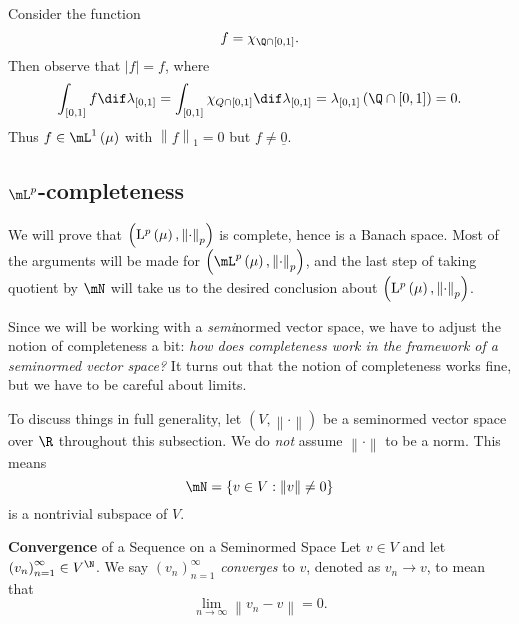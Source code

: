 \documentclass[pmath450]{subfiles}
\begin{document}
    \begin{answer}
        Consider the function
        \begin{equation*}
            f = \chi_{\Q\cap\left[ 0,1 \right]}.
        \end{equation*}
        Then observe that $\left| f \right|=f$, where
        \begin{equation*}
            \int_{\left[ 0,1 \right]} f\dif\lambda_{\left[ 0,1 \right]} = \int_{\left[ 0,1 \right]} \chi_{Q\cap\left[ 0,1 \right]} \dif\lambda_{\left[ 0,1 \right]} = \lambda_{\left[ 0,1 \right]}\left( \Q\cap\left[ 0,1 \right] \right) = 0.
        \end{equation*}
        Thus $f\in\lone\left( \mu \right)$ with $\left\lVert f \right\rVert_{1}=0$ but $f\neq\underline{0}$.
    \end{answer}
    
    \subsection{$\lp$-completeness}

    We will prove that $\left( \operatorname{L^{\text{$p$}}}\left( \mu \right),\left\lVert \cdot\right\rVert_p \right)$ is complete, hence is a Banach space. Most of the arguments will be made for $\left( \lp\left( \mu \right),\left\lVert \cdot\right\rVert_p \right)$, and the last step of taking quotient by $\mN$ will take us to the desired conclusion about $\left( \operatorname{L^{\text{$p$}}}\left( \mu \right),\left\lVert \cdot\right\rVert_p \right)$.
    
    \np Since we will be working with a \textit{semi}normed vector space, we have to adjust the notion of completeness a bit: \textit{how does completeness work in the framework of a seminormed vector space?} It turns out that the notion of completeness works fine, but we have to be careful about limits.

    \np To discuss things in full generality, let $\left( V,\left\lVert \cdot\right\rVert \right)$ be a seminormed vector space over $\R$ throughout this subsection. We do \textit{not} assume $\left\lVert \cdot\right\rVert$ to be a norm. This means
    \begin{equation*}
        \mN = \left\lbrace v\in V: \left\lVert v\right\rVert\neq 0 \right\rbrace
    \end{equation*}
    is a nontrivial subspace of $V$.

    \begin{definition}{\textbf{Convergence} of a Sequence on a Seminormed Space}
        Let $v\in V$ and let $\left( v_{n} \right)^{\infty}_{n=1}\in V^{\N}$. We say $\left( v_{n} \right)^{\infty}_{n=1}$ \emph{converges} to $v$, denoted as $v_n\to v$, to mean that
        \begin{equation*}
            \lim_{n\to\infty} \left\lVert v_n-v\right\rVert = 0.
        \end{equation*}
    \end{definition}
    
\end{document}
